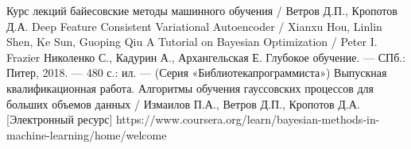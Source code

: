 \begin{thebibliography}{99}
 Курс лекций байесовские методы машинного обучения / Ветров Д.П., Кропотов Д.А.
 Deep Feature Consistent Variational Autoencoder / Xianxu Hou, Linlin Shen, Ke Sun, Guoping Qiu
 A Tutorial on Bayesian Optimization / Peter I. Frazier
 Николенко С., Кадурин А., Архангельская Е. Глубокое обучение. — СПб.: Питер, 2018.	 — 480 с.: ил. — (Серия «Библиотекапрограммиста»)
 Выпускная квалификационная работа. Алгоритмы обучения гауссовских процессов для больших объемов данных / Измаилов П.А., Ветров Д.П., Кропотов Д.А.
 [Электронный ресурс] https://www.coursera.org/learn/bayesian-methods-in-machine-learning/home/welcome

\end{thebibliography}
